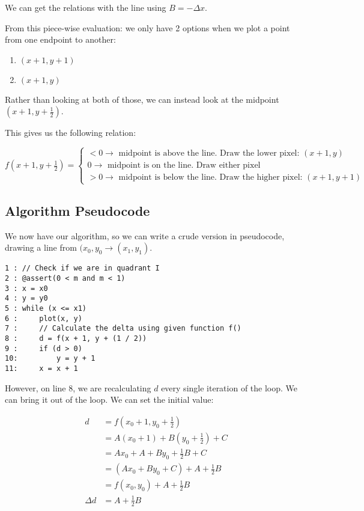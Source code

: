\documentclass[11pt,fleqn]{article}
\theoremstyle{definition}
\begin{document}
We can get the relations with the line using $B = -\Delta x$.

From this piece-wise evaluation: we only have 2 options when we plot a point from one
endpoint to another:

\begin{enumerate}
    \item $(x + 1, y + 1)$
    \item $(x + 1, y)$
\end{enumerate}

\newpage

Rather than looking at both of those, we can instead look at the midpoint $(x + 1, y
+ \frac{1}{2})$.

This gives us the following relation:

$
f(x + 1, y + \frac{1}{2}) =
\begin{cases}
    < 0 \rightarrow \text{ midpoint is above the line. Draw the lower pixel: } (x + 1, y) \\
    0 \rightarrow \text{ midpoint is on the line. Draw either pixel} \\
    > 0 \rightarrow \text{ midpoint is below the line. Draw the higher pixel: } (x + 1, y + 1)
\end{cases}
$

\subsection{Algorithm Pseudocode}

We now have our algorithm, so we can write a crude version in pseudocode, drawing a
line from $(x_0, y_0 \rightarrow (x_1, y_1)$.

\begin{verbatim}
1 : // Check if we are in quadrant I
2 : @assert(0 < m and m < 1)
3 : x = x0
4 : y = y0
5 : while (x <= x1)
6 :     plot(x, y)
7 :     // Calculate the delta using given function f()
8 :     d = f(x + 1, y + (1 / 2))
9 :     if (d > 0)
10:         y = y + 1
11:     x = x + 1
\end{verbatim}

However, on line 8, we are recalculating $d$ every single iteration of the loop. We
can bring it out of the loop. We can set the initial value:

\begin{align*}
    d &= f(x_0 + 1, y_0 + \frac{1}{2}) \\
      &= A(x_0 + 1) + B(y_0 + \frac{1}{2}) + C \\
      &= Ax_0 + A + By_0 + \frac{1}{2}B + C \\
      &= (Ax_0 + By_0 + C) + A + \frac{1}{2}B \\
      &= f(x_0, y_0) + A + \frac{1}{2}B \\
    \Delta d &= A + \frac{1}{2}B
\end{align*}
\end{document}
